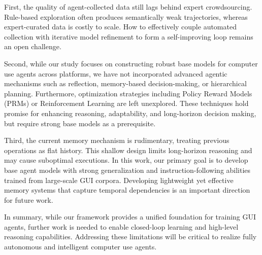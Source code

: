 \documentclass{article} %
\begin{document}
First, the quality of agent-collected data still lags behind expert crowdsourcing. Rule-based exploration often produces semantically weak trajectories, whereas expert-curated data is costly to scale. How to effectively couple automated collection with iterative model refinement to form a self-improving loop remains an open challenge.  

Second, while our study focuses on constructing robust base models for computer use agents across platforms, we have not incorporated advanced agentic mechanisms such as reflection, memory-based decision-making, or hierarchical planning. Furthermore, optimization strategies including Policy Reward Models (PRMs) or Reinforcement Learning are left unexplored. These techniques hold promise for enhancing reasoning, adaptability, and long-horizon decision making, but require strong base models as a prerequisite.  

Third, the current memory mechanism is rudimentary, treating previous operations as flat history. This shallow design limits long-horizon reasoning and may cause suboptimal executions. In this work, our primary goal is to develop base agent models with strong generalization and instruction-following abilities trained from large-scale GUI corpora. Developing lightweight yet effective memory systems that capture temporal dependencies is an important direction for future work.  

In summary, while our framework provides a unified foundation for training GUI agents, further work is needed to enable closed-loop learning and high-level reasoning capabilities. Addressing these limitations will be critical to realize fully autonomous and intelligent computer use agents.








\end{document}
